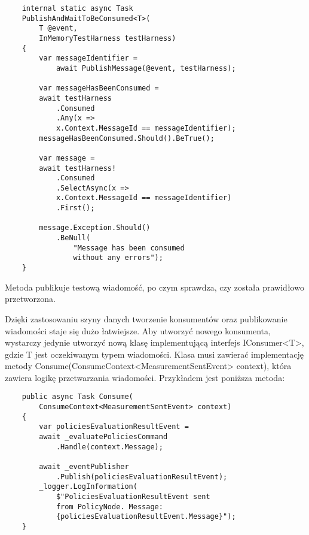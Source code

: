 \begin{addmargin}[0mm]{10mm}
\begin{lstlisting}
    internal static async Task 
    PublishAndWaitToBeConsumed<T>(
        T @event, 
        InMemoryTestHarness testHarness)
    {
        var messageIdentifier = 
            await PublishMessage(@event, testHarness);

        var messageHasBeenConsumed = 
        await testHarness
            .Consumed
            .Any(x => 
            x.Context.MessageId == messageIdentifier);
        messageHasBeenConsumed.Should().BeTrue();

        var message = 
        await testHarness!
            .Consumed
            .SelectAsync(x => 
            x.Context.MessageId == messageIdentifier)
            .First();

        message.Exception.Should()
            .BeNull(
                "Message has been consumed 
                without any errors");
    }
    \end{lstlisting}
\end{addmargin}

Metoda publikuje testową wiadomość, po czym sprawdza, czy została prawidłowo 
przetworzona. 

Dzięki zastosowaniu szyny danych tworzenie konsumentów oraz publikowanie wiadomości 
staje się dużo łatwiejsze. Aby utworzyć nowego konsumenta, wystarczy jedynie utworzyć 
nową klasę implementującą interfejs IConsumer<T>, gdzie T jest oczekiwanym typem 
wiadomości. Klasa musi zawierać implementację metody 
Consume(ConsumeContext<MeasurementSentEvent> context), która zawiera logikę 
przetwarzania wiadomości. Przykładem jest poniższa metoda:

\begin{addmargin}[0mm]{10mm}
\begin{lstlisting}
    public async Task Consume(
        ConsumeContext<MeasurementSentEvent> context)
    {
        var policiesEvaluationResultEvent = 
        await _evaluatePoliciesCommand
            .Handle(context.Message);

        await _eventPublisher
            .Publish(policiesEvaluationResultEvent);
        _logger.LogInformation(
            $"PoliciesEvaluationResultEvent sent 
            from PolicyNode. Message: 
            {policiesEvaluationResultEvent.Message}");
    }

    \end{lstlisting}
\end{addmargin}
    

